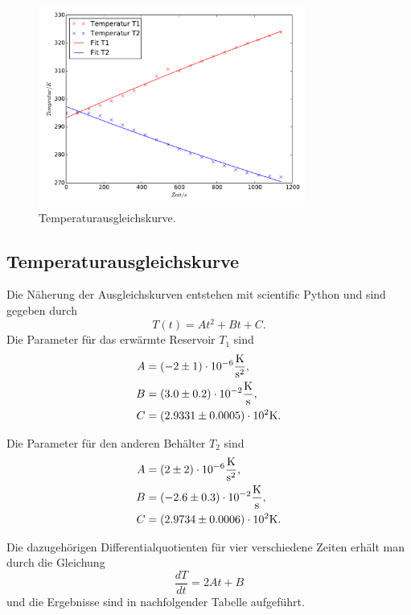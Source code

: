\begin{figure}
  \centering
  \includegraphics[width=0.78\textwidth]{Temperaturgraphik.pdf}
  \caption{Temperaturausgleichskurve.}
  \label{fig:temperaturgraphik}
\end{figure}
\newpage
\subsection{Temperaturausgleichskurve}
Die Näherung der Ausgleichskurven entstehen mit scientific Python und sind gegeben durch
\begin{equation}
  T(t)=At^2+Bt+C .
\end{equation}
Die Parameter für das erwärmte Reservoir $T_1$ sind
\begin{align*}
  A &=(-2\pm1)\cdot10^{-6}\si{\frac{\kelvin}{\second^2}}, \\
  B &=(3.0\pm0.2)\cdot10^{-2}\si{\frac{\kelvin}{\second}}, \\
  C &=(2.9331\pm0.0005)\cdot10^{2}\si{\kelvin}.
\end{align*}

Die Parameter für den anderen Behälter $T_2$ sind
\begin{align*}
  A &= (2\pm2)\cdot10^{-6}\si{\frac{\kelvin}{\second^2}}, \\
  B &= (-2.6\pm0.3)\cdot10^{-2}\si{\frac{\kelvin}{\second}}, \\
  C &= (2.9734\pm0.0006)\cdot10^{2}\si{\kelvin}.
\end{align*}

Die dazugehörigen Differentialquotienten für vier verschiedene Zeiten erhält man
durch die Gleichung
\begin{equation}
  \frac{dT}{dt}=2At+B
\end{equation}
und die Ergebnisse sind in nachfolgender Tabelle aufgeführt.

